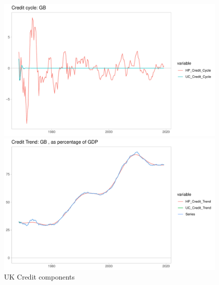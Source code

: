 \documentclass[fleqn]{article}
\begin{document}
\begin{outline}[enumerate]
\begin{figure}[h!]
	\caption{UK Credit components}	
	\centerline{\includegraphics[scale=0.7]{../../VAR_2_notempcovar/Output/Graphs/Credit_cycle_GB.pdf}}
	\centerline{\includegraphics[scale=0.7]{../../VAR_2_notempcovar/Output/Graphs/Credit_trend_GB.pdf}}
\end{figure}


\end{outline}
\end{document}
